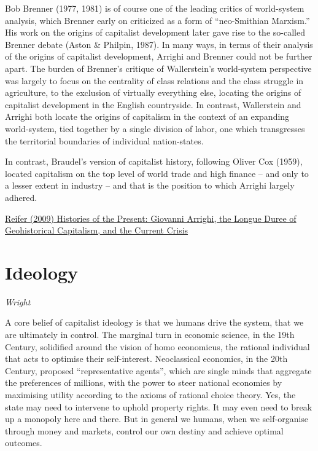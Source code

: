 \documentclass[
]{book}
\begin{document}
Bob Brenner (1977, 1981) is of course one of the leading critics of world-system analysis, which Brenner early on criticized as a form of ``neo-Smithian Marxism.'' His work on the origins of capitalist development later gave rise to the so-called Brenner debate (Aston \& Philpin, 1987). In many ways, in terms of their analysis of the origins of capitalist development, Arrighi and Brenner could not be further apart. The burden of Brenner's critique of Wallerstein's world-system perspective was largely to focus on the centrality of class relations and the class struggle in agriculture, to the exclusion of virtually everything else, locating the origins of capitalist development in the English countryside. In contrast, Wallerstein and Arrighi both locate the origins of capitalism in the context of an expanding world-system, tied together by a single division of labor, one which transgresses the territorial boundaries of individual nation-states.

In contrast, Braudel's version of capitalist history, following Oliver Cox (1959), located capitalism on the top level of world trade and high finance -- and only to a lesser extent in industry -- and that is the position to which Arrighi largely adhered.

\href{https://www.tni.org/en/article/histories-of-the-present-giovanni-arrighi-the-longue-duree-of-geohistorical-capitalism-and}{Reifer (2009) Histories of the Present: Giovanni Arrighi, the Longue Duree of Geohistorical Capitalism, and the Current Crisis}

\hypertarget{ideology}{%
\chapter{Ideology}\label{ideology}}

\emph{Wright}

A core belief of capitalist ideology is that we humans drive the system, that we are ultimately in control. The marginal turn in economic science, in the 19th Century, solidified around the vision of homo economicus, the rational individual that acts to optimise their self-interest. Neoclassical economics, in the 20th Century, proposed ``representative agents'', which are single minds that aggregate the preferences of millions, with the power to steer national economies by maximising utility according to the axioms of rational choice theory. Yes, the state may need to intervene to uphold property rights. It may even need to break up a monopoly here and there. But in general we humans, when we self-organise through money and markets, control our own destiny and achieve optimal outcomes.
\end{document}
